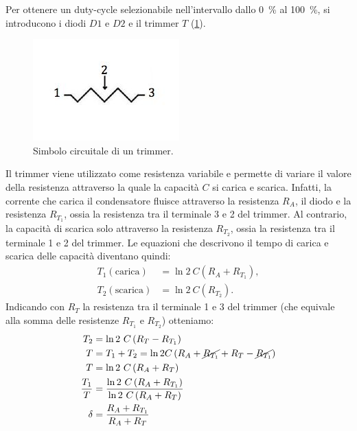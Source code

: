 \noindent
Per ottenere un duty-cycle selezionabile nell'intervallo dallo \SI{0}{\percent} al \SI{100}{\percent}, si introducono i diodi $D1$ e $D2$ e il trimmer $T$ (\Fig\ref{fig:trimmer}).
\begin{figure}[tbh]
	\centering
	\includegraphics[width=0.2\linewidth]{./ImageFiles/Laboratorio 5/trimmer.jpg}
	\caption{Simbolo circuitale di un trimmer.}
	\label{fig:trimmer}
\end{figure}
Il trimmer viene utilizzato come resistenza variabile e permette di variare il valore della resistenza attraverso la quale la capacità $C$ si carica e scarica. Infatti, la corrente che carica il condensatore fluisce attraverso la resistenza $R_A$, il diodo e la resistenza $R_{T_1}$, ossia la resistenza tra il terminale 3 e 2 del trimmer. Al contrario, la capacità di scarica solo attraverso la resistenza $R_{T_2}$, ossia la resistenza tra il terminale 1 e 2 del trimmer. Le equazioni che descrivono il tempo di carica e scarica delle capacità diventano quindi:
\begin{equation}
	\begin{split}
		T_1(\text{carica})&=\ln{2}\ C\left(R_A+R_{T_1}\right), \\
		T_2(\text{scarica})&=\ln{2}\ C\left(R_{T_2}\right).
	\end{split}
\end{equation}
Indicando con $R_T$ la resistenza tra il terminale 1 e 3 del trimmer (che equivale alla somma delle resistenze $R_{T_1}$ e $R_{T_2}$) otteniamo:
\begin{equation}
	\begin{split}
		T_2&=\ln{2}\ C\left(R_T-R_{T_1}\right) \\
		T&=T_1+T_2=\ln{2} C\left(R_A+\cancel{R_{T_1}}+R_T-\cancel{R_{T_1}}\right) \\
		T&=\ln{2}\ C\left(R_A+R_T\right) \\
		\frac{T_1}{T}&=\frac{\ln{2}\ C\left(R_A+R_{T_1}\right)}{\ln{2}\ C\left(R_A+R_T\right)} \\
		\delta&=\frac{R_A+R_{T_1}}{R_A+R_T}
	\end{split}
\end{equation}
